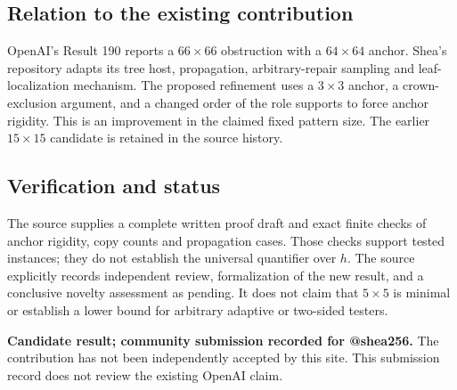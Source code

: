 \documentclass[11pt]{article}
\begin{document}
\subsection{Relation to the existing contribution}
OpenAI's Result 190 reports a $66\times66$ obstruction with a
$64\times64$ anchor. Shea's repository adapts its tree host, propagation,
arbitrary-repair sampling and leaf-localization mechanism. The proposed
refinement uses a $3\times3$ anchor, a crown-exclusion argument, and a
changed order of the role supports to force anchor rigidity. This is an
improvement in the claimed fixed pattern size. The earlier $15\times15$
candidate is retained in the source history.

\subsection{Verification and status}
The source supplies a complete written proof draft and exact finite
checks of anchor rigidity, copy counts and propagation cases. Those
checks support tested instances; they do not establish the universal
quantifier over $h$. The source explicitly records independent review,
formalization of the new result, and a conclusive novelty assessment as
pending. It does not claim that $5\times5$ is minimal or establish a
lower bound for arbitrary adaptive or two-sided testers.

\textbf{Candidate result; community submission recorded for @shea256.}
The contribution has not been independently accepted by this site.
This submission record does not review the existing OpenAI claim.
\end{document}
